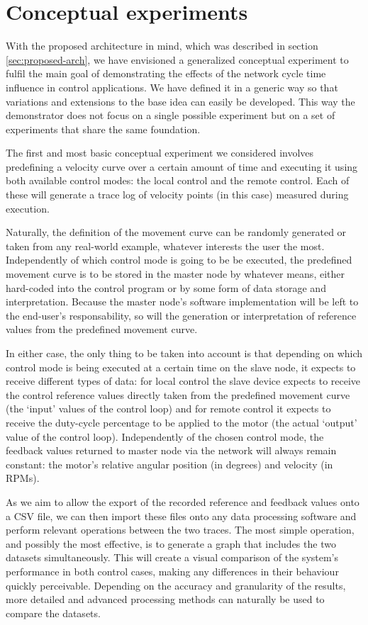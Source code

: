 \section{Conceptual experiments} \label{sec:experiments}

With the proposed architecture in mind, which was described in section \ref{sec:proposed-arch}, we have envisioned a generalized conceptual experiment to fulfil the main goal of demonstrating the effects of the network cycle time influence in control applications.
We have defined it in a generic way so that variations and extensions to the base idea can easily be developed.
This way the demonstrator does not focus on a single possible experiment but on a set of experiments that share the same foundation.

The first and most basic conceptual experiment we considered involves predefining a velocity curve over a certain amount of time and executing it using both available control modes: the local control and the remote control.
Each of these will generate a trace log of velocity points (in this case) measured during execution.

Naturally, the definition of the movement curve can be randomly generated or taken from any real-world example, whatever interests the user the most.
Independently of which control mode is going to be be executed, the predefined movement curve is to be stored in the master node by whatever means, either hard-coded into the control program or by some form of data storage and interpretation.
Because the master node's software implementation will be left to the end-user's responsability, so will the generation or interpretation of reference values from the predefined movement curve.

In either case, the only thing to be taken into account is that depending on which control mode is being executed at a certain time on the slave node, it expects to receive different types of data: for local control the slave device expects to receive the control reference values directly taken from the predefined movement curve (the `input' values of the control loop) and for remote control it expects to receive the duty-cycle percentage to be applied to the motor (the actual `output' value of the control loop).
Independently of the chosen control mode, the feedback values returned to master node via the network will always remain constant: the motor's relative angular position (in degrees) and velocity (in RPMs).

As we aim to allow the export of the recorded reference and feedback values onto a CSV file, we can then import these files onto any data processing software and perform relevant operations between the two traces.
The most simple operation, and possibly the most effective, is to generate a graph that includes the two datasets simultaneously.
This will create a visual comparison of the system's performance in both control cases, making any differences in their behaviour quickly perceivable.
Depending on the accuracy and granularity of the results, more detailed and advanced processing methods can naturally be used to compare the datasets.


